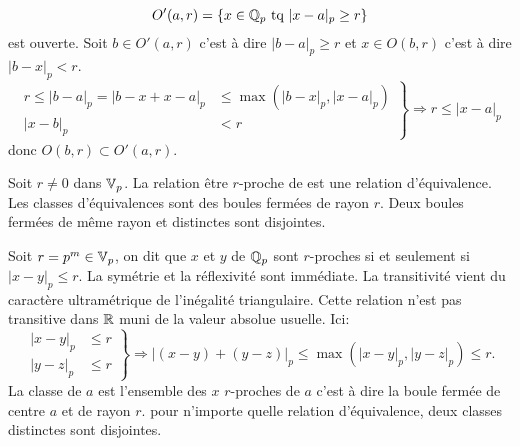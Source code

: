\begin{demo}
\begin{displaymath}
 O'(a,r) = \left\lbrace x\in \mathbb{Q}_p \text{ tq } |x-a|_p \geq r \right\rbrace
\end{displaymath}
est ouverte. Soit $b\in O'(a,r)$ c'est à dire $|b-a|_p \geq r$ et $x\in O(b,r)$ c'est à dire $|b-x|_p < r$.
\begin{displaymath}
\left.
  \begin{aligned}
    r \leq |b-a|_p = |b-x + x-a|_p &\leq \max(|b-x|_p, |x-a|_p) \\
    |x-b|_p &< r
  \end{aligned}
\right\rbrace
    \Rightarrow
    r \leq |x-a|_p
\end{displaymath}
donc $O(b,r) \subset O'(a,r)$.
\end{demo}

\begin{propn}\label{prop:r-procheEquiv}
Soit $r \neq 0$ dans $\mathbb{V}_p$. La relation \og être $r$-proche de \fg  est une relation d'équivalence. Les classes d'équivalences sont des boules fermées de rayon $r$. Deux boules fermées de même rayon et distinctes sont disjointes.
\end{propn}
\begin{demo}
 Soit $r = p^m  \in \mathbb{V}_p$, on dit que $x$ et $y$ de $\mathbb{Q}_p$ sont $r$-proches si et seulement si $|x-y|_p \leq r$.\newline
 La symétrie et la réflexivité sont immédiate. La transitivité vient du caractère ultramétrique de l'inégalité triangulaire. Cette relation n'est pas transitive dans $\mathbb{R}$ muni de la valeur absolue usuelle. Ici:
 \begin{displaymath}
  \left.
  \begin{aligned}
   |x-y|_p &\leq r \\
   |y-z|_p &\leq r
  \end{aligned}
  \right\rbrace \Rightarrow
  |(x-y) + (y-z)|_p \leq \max\left(|x-y|_p, |y-z|_p  \right) \leq r.
 \end{displaymath}
 La classe de $a$ est l'ensemble des $x$ $r$-proches de $a$ c'est à dire la boule fermée de centre $a$ et de rayon $r$. pour n'importe quelle relation d'équivalence, deux classes distinctes sont disjointes.
\end{demo}

